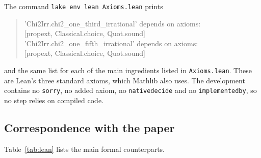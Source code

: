\documentclass[11pt]{amsart}
\theoremstyle{definition}
\theoremstyle{remark}
\numberwithin{equation}{section}
\newcommand{\lean}[1]{{\def\_{\textunderscore\allowbreak}\texttt{#1}}}
\begin{document}
The command \lean{lake env lean Axioms.lean} prints
\begin{quote}\ttfamily\small
'Chi2Irr.chi2\_one\_third\_irrational' depends on axioms:\\
\hspace*{2em}[propext, Classical.choice, Quot.sound]\\
'Chi2Irr.chi2\_one\_fifth\_irrational' depends on axioms:\\
\hspace*{2em}[propext, Classical.choice, Quot.sound]
\end{quote}
and the same list for each of the main ingredients listed in \lean{Axioms.lean}. These are Lean's three standard axioms,
which Mathlib also uses. The development contains no \lean{sorry}, no added axiom, no \lean{native\_decide} and no
\lean{implemented\_by}, so no step relies on compiled code.

\subsection{Correspondence with the paper}
Table~\ref{tab:lean} lists the main formal counterparts.
\end{document}
